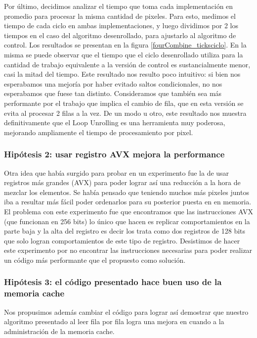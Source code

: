 Por último, decidimos analizar el tiempo que toma cada implementación en promedio para procesar la misma cantidad de pixeles. Para esto, medimos el tiempo de cada ciclo en ambas implementaciones, y luego dividimos por 2 los tiempos en el caso del algoritmo desenrollado, para ajustarlo al algoritmo de control. Los resultados se presentan en la figura \ref{fourCombine_ticksciclo}. En la misma se puede observar que el tiempo que el ciclo desenrollado utiliza para la cantidad de trabajo equivalente a la versión de control es sustancialmente menor, casi la mitad del tiempo. Este resultado nos resulto poco intuitivo: si bien nos esperabamos una mejoría por haber evitado saltos condicionales, no nos esperabamos que fuese tan distinto. Consideramos que también sea más performante por el trabajo que implica el cambio de fila, que en esta versión se evita al procesar 2 filas a la vez. De un modo u otro, este resultado nos muestra definitivamente que el Loop Unrolling es una herramienta muy poderosa, mejorando ampliamente el tiempo de procesamiento por pixel.

\subsubsection*{Hipótesis 2: usar registro AVX mejora la performance}
Otra idea que había surgido para probar en un experimento fue la de usar registros más grandes (AVX) para poder lograr así una reducción a la hora de mezclar los elementos. Se había pensado que teniendo muchos más pixeles juntos iba a resultar más fácil poder ordenarlos para su posterior puesta en en memoria. El problema con este experimento fue que encontramos que las instrucciones AVX (que funcionan en 256 bits) lo único que hacen es replicar comportamientos en la parte baja y la alta del registro es decir los trata como dos registros de 128 bits que solo logran comportamientos de este tipo de registro. Desistimos de hacer este experimento por no encontrar las instrucciones necesarias para poder realizar un código más performante que el propuesto como solución.

\subsubsection*{Hipótesis 3: el código presentado hace buen uso de la memoria cache}
Nos propusimos además cambiar el código para lograr así demostrar que nuestro algoritmo presentado al leer fila por fila logra una mejora en cuando a la administración de la memoria cache. 

